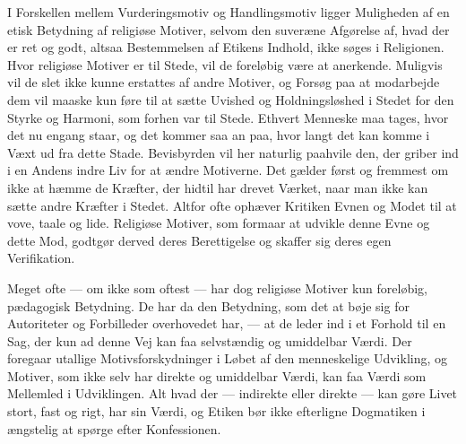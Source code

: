 \documentclass[12pt,a4paper,openany]{book}
\newcommand{\opage}[1]{\marginnote{\footnotesize\textit{[#1]}}}
\begin{document}
I Forskellen mellem Vurderingsmotiv og Handlingsmotiv ligger Muligheden
af en etisk Betydning af religiøse Motiver, selvom den suveræne
Afgørelse af, hvad der er ret og godt, altsaa Bestemmelsen af Etikens
Indhold, ikke søges i Religionen. Hvor religiøse Motiver er til Stede,
vil de foreløbig være at anerkende. Muligvis vil de slet ikke kunne
erstattes af andre Motiver, og Forsøg paa at modarbejde dem vil maaske
kun føre til at sætte Uvished og Holdningsløshed i Stedet for den Styrke
og Harmoni, som forhen var til Stede. Ethvert Menneske maa tages, hvor
det nu engang staar, og det kommer saa an paa, hvor langt det kan komme
i Væxt ud fra dette Stade. Bevisbyrden vil her naturlig paahvile den,
der griber ind i en Andens indre Liv for at ændre Motiverne. Det gælder
først og fremmest om ikke at hæmme de Kræfter, der hidtil har drevet
Værket, naar man ikke kan sætte andre Kræfter i Stedet. Altfor ofte
ophæver Kritiken Evnen og Modet til at vove, taale og lide. Religiøse
Motiver, som formaar at udvikle denne Evne og dette Mod, godtgør derved
deres Berettigelse og skaffer sig deres egen Verifikation.

Meget ofte --- om ikke som oftest --- har dog religiøse Motiver kun
foreløbig, pædagogisk Betydning. De har da den Betydning, som det at
bøje sig for Autoriteter og Forbilleder overhovedet har, --- at de leder
ind i et Forhold til en Sag, der kun ad denne Vej kan faa selvstændig og
umiddelbar Værdi. Der foregaar utallige Motivsforskydninger i Løbet af
den menneskelige Udvikling, og Motiver, som ikke selv har direkte og
umiddelbar Værdi, kan faa Værdi som Mellemled i Udviklingen. Alt hvad
der --- indirekte eller direkte --- kan gøre Livet stort, fast
\opage{219}og rigt, har sin Værdi, og Etiken bør ikke efterligne
Dogmatiken i ængstelig at spørge efter Konfessionen.
\end{document}

